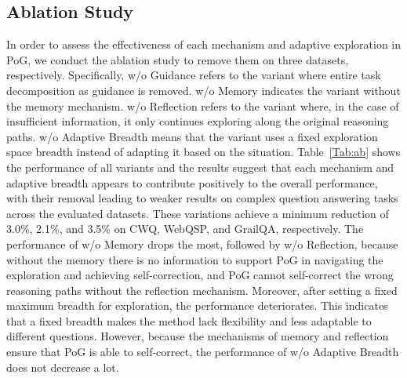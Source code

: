 \documentclass{article}
\begin{document}
\subsection{Ablation Study}
\vspace{-2mm}
\begin{table}
\small
\centering
\vspace{-11mm}
\caption{Performance of removing each mechanism and adaptive exploration, respectively.}
\label{Tab:ab}
\end{table}
In order to assess the effectiveness of each mechanism and adaptive exploration in PoG, we conduct the ablation study to remove them on three datasets, respectively. 
Specifically, w/o Guidance refers to the variant where entire task decomposition as guidance is removed. w/o Memory indicates the variant without the memory mechanism. 
w/o Reflection refers to the variant where, in the case of insufficient information, it only continues exploring along the original reasoning paths. 
w/o Adaptive Breadth means that the variant uses a fixed exploration space breadth instead of adapting it based on the situation. 
Table~\ref{Tab:ab} shows the performance of all variants and the results suggest that each mechanism and adaptive breadth appears to contribute positively to the overall performance, with their removal leading to weaker results on complex question answering tasks across the evaluated datasets.
These variations achieve a minimum reduction of 3.0\%, 2.1\%, and 3.5\% on CWQ, WebQSP, and GrailQA, respectively.
The performance of w/o Memory drops the most, followed by w/o Reflection, because without the memory there is no information to support PoG in navigating the exploration and achieving self-correction, and PoG cannot self-correct the wrong reasoning paths without the reflection mechanism.
Moreover, after setting a fixed maximum breadth for exploration, the performance deteriorates. This indicates that a fixed breadth makes the method lack flexibility and less adaptable to different questions. However, because the mechanisms of memory and reflection ensure that PoG is able to self-correct, the performance of w/o Adaptive Breadth does not decrease a lot.
\end{document}
